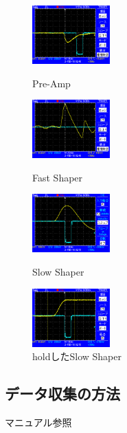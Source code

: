 \documentclass[10pt]{ujarticle}
\begin{document}
\begin{figure}[h]
\begin{minipage}[t]{0.25\hsize}
\begin{center}
\includegraphics[width=3cm]{preamp.BMP}
\end{center}
\caption{Pre-Amp}
\end{minipage}
\begin{minipage}[t]{0.25\hsize}
\begin{center}
\includegraphics[width=3cm]{fastshaper.BMP}
\end{center}
\caption{Fast Shaper}
\end{minipage}
\begin{minipage}[t]{0.25\hsize}
\begin{center}
\includegraphics[width=3cm]{slowshaper.BMP}
\end{center}
\caption{Slow Shaper}
\end{minipage}
\begin{minipage}[t]{0.25\hsize}
\begin{center}
\includegraphics[width=3cm]{slowshaperhold.BMP}
\end{center}
\caption{holdしたSlow Shaper}
\end{minipage}
\end{figure}
\subsection{データ収集の方法}
マニュアル参照
\end{document}
